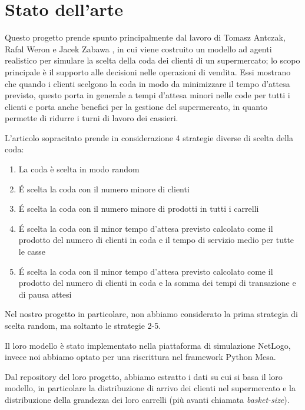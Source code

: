 \chapter{Stato dell'arte}


Questo progetto prende spunto principalmente dal lavoro di Tomasz Antczak, Rafal Weron e Jacek Zabawa \cite{article1}, in cui viene costruito un modello ad agenti realistico per simulare la scelta della coda dei clienti di un supermercato; lo scopo principale è il supporto alle decisioni nelle operazioni di vendita. Essi mostrano che quando i clienti scelgono la coda in modo da minimizzare il tempo d'attesa previsto, questo porta in generale a tempi d'attesa minori nelle code per tutti i clienti e porta anche benefici per la gestione del supermercato, in quanto permette di ridurre i turni di lavoro dei cassieri.

L'articolo sopracitato prende in considerazione 4 strategie diverse di scelta della coda:

\begin{enumerate}
	\item La coda è scelta in modo random
	\item \'E scelta la coda con il numero minore di clienti
	\item \'E scelta la coda con il numero minore di prodotti in tutti i carrelli
	\item \'E scelta la coda con il minor tempo d'attesa previsto calcolato come il prodotto del numero di clienti in coda e il tempo di servizio medio per tutte le casse
	\item \'E scelta la coda con il minor tempo d'attesa previsto calcolato come il prodotto del numero di clienti in coda e la somma dei tempi di transazione e di pausa attesi
\end{enumerate}

Nel nostro progetto in particolare, non abbiamo considerato la prima strategia di scelta random, ma soltanto le strategie 2-5.

Il loro modello è stato implementato nella piattaforma di simulazione NetLogo, invece noi abbiamo optato per una riscrittura nel framework Python Mesa.

Dal repository del loro progetto, abbiamo estratto i dati su cui si basa il loro modello, in particolare la distribuzione di arrivo dei clienti nel supermercato e la distribuzione della grandezza dei loro carrelli (più avanti chiamata \textit{basket-size}).

